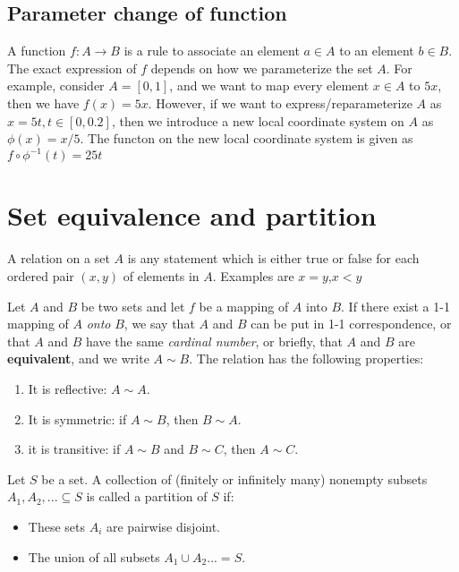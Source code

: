 \begin{refsection}
\subsection{Parameter change of function}
A function $f: A \rightarrow B$ is a rule to associate an element $a \in A$ to an element $b \in B$. The exact expression of $f$ depends on how we parameterize the set $A$. For example, consider $A=[0,1]$, and we want to map every element $x\in A$ to $5x$, then we have $f(x)=5x$. However, if we want to express/reparameterize $A$ as $x=5t,t\in [0,0.2]$, then we introduce a new local coordinate system on $A$ as $\phi(x)=x/5$. The functon on the new local coordinate system is given as $f\circ \phi^{-1}(t) = 25t$ 



\section{Set equivalence and partition}
\begin{definition}[relation]
A relation on a set $A$ is any statement which is either true or false for each ordered pair $(x,y)$ of elements in $A$. Examples are $x=y$,$x<y$
\end{definition}


\begin{definition}\cite{johnsonbaugh2010foundations}
Let $A$ and $B$ be two sets and let $f$ be a mapping of $A$ into $B$. If there exist a 1-1 mapping of $A$ \emph{onto} $B$, we say that $A$ and $B$ can be put in 1-1 correspondence, or that $A$ and $B$ have the same \emph{cardinal number}, or briefly, that $A$ and $B$ are \textbf{equivalent}, and we write $A\sim B$. The relation has the following properties:
\begin{enumerate}
\item It is reflective: $A \sim A$.
\item It is symmetric: if $A \sim B$, then $B \sim A$.
\item it is transitive: if $A \sim B$ and $B \sim C$, then $A \sim C$.
\end{enumerate}
\end{definition}

\begin{definition}
Let $S$ be a set. A collection of (finitely or infinitely many) nonempty subsets $A_1,A_2,...\subseteq S$ is called a partition of $S$ if:
\begin{itemize}
    \item These sets $A_i$ are pairwise disjoint.
    \item The union of all subsets $A_1\cup A_2 ... = S$. 
\end{itemize}
\end{definition}



\end{refsection}
